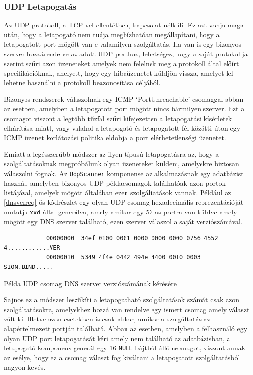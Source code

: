 \documentclass[a4paper,12pt]{article}
\begin{document}
\subsubsection{UDP Letapogatás} \label{ssec:udpscan}

	Az UDP protokoll, a TCP-vel ellentétben, kapcsolat nélküli. Ez azt vonja maga után, hogy a letapogató nem tudja megbízhatóan megállapítani, hogy a letapogatott port mögött van-e valamilyen szolgáltatás. Ha van is egy bizonyos szerver hozzárendelve az adott UDP porthoz, lehetséges, hogy a saját protokollja szerint szűri azon üzeneteket amelyek nem felelnek meg a protokoll által előírt specifikációknak, ahelyett, hogy egy hibaüzenetet küldjön vissza, amelyet fel lehetne használni a protokoll beazonosítása céljából.
	
	Bizonyos rendszerek válaszolnak egy ICMP `PortUnreachable' csomaggal abban az esetben, amelyben a letapogatott port mögött nincs bármilyen szerver. Ezt a csomagot viszont a legtöbb tűzfal szűri kifejezetten a letapogatási kísérletek elhárítása miatt, vagy valahol a letapogató és letapogatott fél közötti úton egy ICMP üzenet korlátozási politika eldobja a port elérhetetlenségi üzenetet.
	
	Emiatt a legésszerűbb módszer az ilyen típusú letapogatásra az, hogy a szolgáltatásoknak megpróbálunk olyan üzeneteket küldeni, amelyekre biztosan válaszolni fognak. Az \texttt{UdpScanner} komponense az alkalmazásnak egy adatbázist használ, amelyben bizonyos UDP példacsomagok találhatóak azon portok listájával, amelyek mögött általában ezen szolgáltatások vannak. Például az \ref{dnsverreq}-ös kódrészlet egy olyan UDP csomag hexadecimális reprezentációját mutatja \texttt{xxd} által generálva, amely amikor egy 53-as portra van küldve amely mögött egy DNS szerver található, ezen szerver válaszol a saját verziószámával.

	\begin{listing}[H]
		\begin{verbatim}
			00000000: 34ef 0100 0001 0000 0000 0000 0756 4552  4............VER
			00000010: 5349 4f4e 0442 494e 4400 0010 0003       SION.BIND.....
		\end{verbatim}
		\caption{Példa UDP csomag DNS szerver verziószámának kérésére}
		\label{dnsverreq}
	\end{listing}
	
	Sajnos ez a módszer leszűkíti a letapogatható szolgáltatások számát csak azon szolgáltatásokra, amelyekhez hozzá van rendelve egy ismert csomag amely választ vált ki. Illetve azon esetekben is csak akkor, amikor a szolgáltatás az alapértelmezett portján található. Abban az esetben, amelyben a felhasználó egy olyan UDP port letapogatását kéri amely nem található az adatbázisban, a letapogató komponens generál egy 16 \texttt{NULL} bájtból álló csomagot, viszont annak az esélye, hogy ez a csomag választ fog kiváltani a letapogatott szolgáltatásból nagyon kevés.
	
\end{document}
